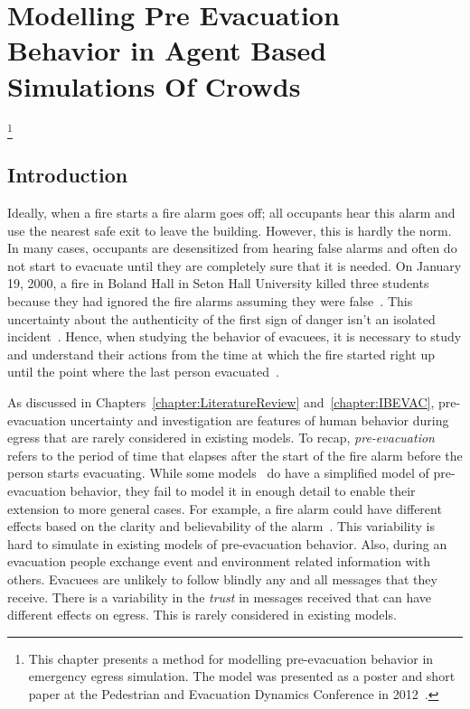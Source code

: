
\chapter{Modelling Pre Evacuation Behavior in Agent Based Simulations Of Crowds}\footnote{This chapter presents a method for modelling pre-evacuation behavior in emergency egress simulation. The model was presented as a poster and short paper at the Pedestrian and Evacuation Dynamics Conference in 2012~\cite{Viswanathan:2012vt}.}
\label{chapter:PreEvacuationBehavior}

\section{Introduction}
\label{PreEvac:intro}
Ideally, when a fire starts a fire alarm goes off; all occupants hear this alarm and use the nearest safe exit to leave the building. However, this is hardly the norm. In many cases, occupants are desensitized from hearing false alarms and often do not start to evacuate until they are completely sure that it is needed. On January 19, 2000, a fire in Boland Hall in Seton Hall University killed three students because they had ignored the fire alarms assuming they were false~\cite{Berry:2000us}. This uncertainty about the authenticity of the first sign of danger isn't an isolated incident~\cite{Proulx:2003tc,Purser:2001ts,Tong:1985wn}. Hence, when studying the behavior of evacuees, it is necessary to study and understand their actions from the time at which the fire started right up until the point where the last person evacuated~\cite{Tong:1985wn}.



As discussed in Chapters~\ref{chapter:LiteratureReview} and~\ref{chapter:IBEVAC}, pre-evacuation uncertainty and investigation are features of human behavior during egress that are rarely considered in existing models. To recap, \emph{pre-evacuation} refers to the period of time that elapses after the start of the fire alarm before the person starts evacuating. While some models~\cite{Tsai:2011tz} do have a simplified model of pre-evacuation behavior, they fail to model it in enough detail to enable their extension to more general cases. For example, a fire alarm could have different effects based on the clarity and believability of the alarm~\cite{Kobes:2009jx,Paulsen:1984ti}. This variability is hard to simulate in existing models of pre-evacuation behavior. Also, during an evacuation people exchange event and environment related information with others. Evacuees are unlikely to follow blindly any and all messages that they receive. There is a variability in the \emph{trust} in messages received that can have different effects on egress. This is rarely considered in existing models.


